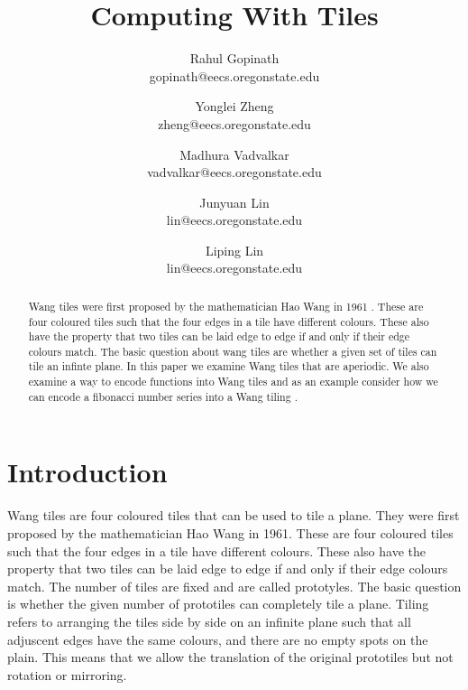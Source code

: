 \documentclass{article}
\begin{document}
\title{Computing With Tiles}
\author{
Rahul Gopinath\\
gopinath@eecs.oregonstate.edu
\and
Yonglei Zheng\\
zheng@eecs.oregonstate.edu
\and
Madhura Vadvalkar\\
vadvalkar@eecs.oregonstate.edu
\and
Junyuan Lin\\
lin@eecs.oregonstate.edu
\and
Liping Lin\\
lin@eecs.oregonstate.edu
}

\maketitle


\begin{abstract}
Wang tiles were first proposed by the mathematician Hao Wang in 1961 \cite{wang}. These are four coloured tiles such that the four edges in a tile have different colours. These also have the property that two tiles can be laid edge to edge if and only if their edge colours match. The basic question about wang tiles are whether a given set of tiles can tile an infinte plane. In this paper we examine Wang tiles that are aperiodic\cite{undecide}. We also examine a way to encode functions into Wang tiles and as an example consider how we can encode a fibonacci number series into a Wang tiling \cite{tilings}.
\end{abstract}

\section*{Introduction}
Wang tiles are four coloured tiles that can be used to tile a plane.  They were first proposed by the mathematician Hao Wang in 1961. These are four coloured tiles such that the four edges in a tile have different colours. These also have the property that two tiles can be laid edge to edge if and only if their edge colours match. The number of tiles are fixed and are called prototyles. The basic question is whether the given number of prototiles can completely tile a plane. Tiling refers to arranging the tiles side by side on an infinite plane such that all adjuscent edges have the same colours, and there are no empty spots on the plain. This means that we allow the translation of the original prototiles but not rotation or mirroring.
\end{document}
